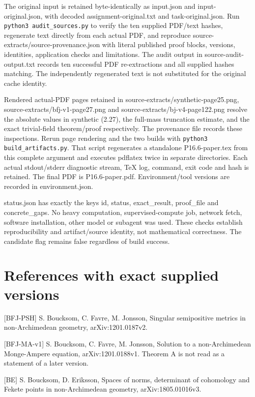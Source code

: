 \documentclass[11pt]{article}
\begin{document}
The original input is retained byte-identically as input.json and input-original.json, with decoded assignment-original.txt and task-original.json. Run \texttt{python3 audit\_sources.py} to verify the ten supplied PDF/text hashes, regenerate text directly from each actual PDF, and reproduce source-extracts/source-provenance.json with literal published proof blocks, versions, identities, application checks and limitations. The audit output in source-audit-output.txt records ten successful PDF re-extractions and all supplied hashes matching. The independently regenerated text is not substituted for the original cache identity.

Rendered actual-PDF pages retained in source-extracts/synthetic-page25.png, source-extracts/bfj-v1-page27.png and source-extracts/bj-v4-page122.png resolve the absolute values in synthetic (2.27), the full-mass truncation estimate, and the exact trivial-field theorem/proof respectively. The provenance file records these inspections. Rerun page rendering and the two builds with \texttt{python3 build\_artifacts.py}. That script regenerates a standalone P16.6-paper.tex from this complete argument and executes pdflatex twice in separate directories. Each actual stdout/stderr diagnostic stream, TeX log, command, exit code and hash is retained. The final PDF is P16.6-paper.pdf. Environment/tool versions are recorded in environment.json.

status.json has exactly the keys id, status, exact\_result, proof\_file and concrete\_gaps. No heavy computation, supervised-compute job, network fetch, software installation, other model or subagent was used. These checks establish reproducibility and artifact/source identity, not mathematical correctness. The candidate flag remains false regardless of build success.

\section*{References with exact supplied versions}

[BFJ-PSH] S. Boucksom, C. Favre, M. Jonsson, Singular semipositive metrics in non-Archimedean geometry, arXiv:1201.0187v2.

[BFJ-MA-v1] S. Boucksom, C. Favre, M. Jonsson, Solution to a non-Archimedean Monge-Ampere equation, arXiv:1201.0188v1. Theorem A is not read as a statement of a later version.

[BE] S. Boucksom, D. Eriksson, Spaces of norms, determinant of cohomology and Fekete points in non-Archimedean geometry, arXiv:1805.01016v3.
\end{document}
